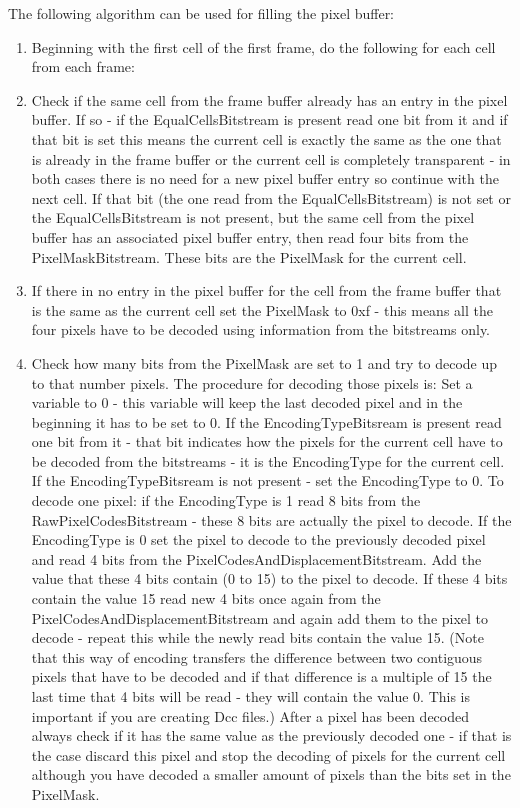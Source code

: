 The following algorithm can be used for filling the pixel buffer:

\begin{enumerate}
\item Beginning with the first cell of the first frame, do the following for 
each cell from each frame:

\item Check if the same cell from the frame buffer already has an entry in the 
pixel buffer. If so - if the EqualCellsBitstream is present read one bit from it 
and if that bit is set this means the current cell is exactly the same as the 
one that is already in the frame buffer or the current cell is completely 
transparent - in both cases there is no need for a new pixel buffer entry so 
continue with the next cell. If that bit (the one read from the 
EqualCellsBitstream) is not set or the EqualCellsBitstream is not present, 
but the same cell from the pixel buffer has an associated pixel buffer entry, 
then read four bits from the PixelMaskBitstream. 
These bits are the PixelMask for the current cell.

\item If there in no entry in the pixel buffer for the cell from the frame 
buffer that is the same as the current cell set the PixelMask to 0xf - this 
means all the four pixels have to be decoded using information from the 
bitstreams only.

\item Check how many bits from the PixelMask are set to 1 and try to decode up 
to that number pixels. The procedure for decoding those pixels is: Set a 
variable to 0 - this variable will keep the last decoded pixel and in the 
beginning it has to be set to 0. If the EncodingTypeBitsream is present read 
one bit from it - that bit indicates how the pixels for the current cell have to 
be decoded from the bitstreams - it is the EncodingType for the current cell. 
If the EncodingTypeBitsream is not present - set the EncodingType to 0. To 
decode one pixel: if the EncodingType is 1 read 8 bits from the 
RawPixelCodesBitstream - these 8 bits are actually the pixel to decode. If the 
EncodingType is 0 set the pixel to decode to the previously decoded pixel and 
read 4 bits from the PixelCodesAndDisplacementBitstream. Add the value that 
these 4 bits contain (0 to 15) to the pixel to decode. If these 4 bits contain 
the value 15 read new 4 bits once again from the 
PixelCodesAndDisplacementBitstream and again add them to the pixel to decode - 
repeat this while the newly read bits contain the value 15. (Note that this way 
of encoding transfers the difference between two contiguous pixels that have to 
be decoded and if that difference is a multiple of 15 the last time that 4 bits 
will be read - they will contain the value 0. This is important if you are 
creating Dcc files.) After a pixel has been decoded always check if it has the 
same value as the previously decoded one - if that is the case discard this 
pixel and stop the decoding of pixels for the current cell although you have 
decoded a smaller amount of pixels than the bits set in the PixelMask.


\end{enumerate}
